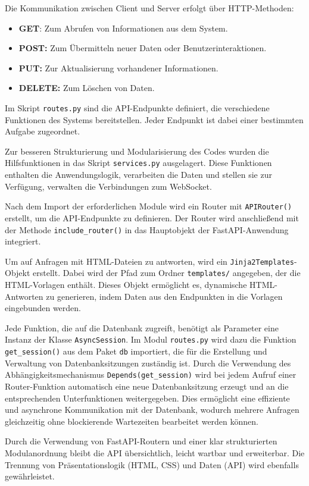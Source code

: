 \documentclass[12pt, letterpaper]{article}
\begin{document}
  
  \par Die Kommunikation zwischen Client und Server erfolgt über HTTP-Methoden:
  \begin{itemize}
    \item \textbf{GET}: Zum Abrufen von Informationen aus dem System.
    \item \textbf{POST:} Zum Übermitteln neuer Daten oder Benutzerinteraktionen.
    \item \textbf{PUT:} Zur Aktualisierung vorhandener Informationen. 
    \item \textbf{DELETE:} Zum Löschen von Daten.
  \end{itemize} 
  \par Im Skript \texttt{routes.py} sind die API-Endpunkte definiert, die verschiedene Funktionen des Systems bereitstellen. Jeder Endpunkt ist dabei einer bestimmten Aufgabe zugeordnet. 
  \par Zur besseren Strukturierung und Modularisierung des Codes wurden die Hilfsfunktionen in das Skript \texttt{services.py} ausgelagert. Diese Funktionen enthalten die Anwendungslogik, verarbeiten die Daten und stellen sie zur Verfügung, verwalten die Verbindungen zum WebSocket.
  \par Nach dem Import der erforderlichen Module wird ein Router mit \texttt{APIRouter()} erstellt, um die API-Endpunkte zu definieren. Der Router wird anschließend mit der Methode \texttt{include\_router()} in das Hauptobjekt der FastAPI-Anwendung integriert.
  \par Um auf Anfragen mit HTML-Dateien zu antworten, wird ein \texttt{Jinja2Templates}-Objekt erstellt. Dabei wird der Pfad zum Ordner \texttt{templates/} angegeben, der die HTML-Vorlagen enthält. Dieses Objekt ermöglicht es, dynamische HTML-Antworten zu generieren, indem Daten aus den Endpunkten in die Vorlagen eingebunden werden.
  \par Jede Funktion, die auf die Datenbank zugreift, benötigt als Parameter eine Instanz der Klasse \texttt{AsyncSession}. Im Modul \texttt{routes.py} wird dazu die Funktion \texttt{get\_session()} aus dem Paket \texttt{db} importiert, die für die Erstellung und Verwaltung von Datenbanksitzungen zuständig ist. Durch die Verwendung des Abhängigkeitsmechanismus \texttt{Depends(get\_session)} wird bei jedem Aufruf einer Router-Funktion automatisch eine neue Datenbanksitzung erzeugt und an die entsprechenden Unterfunktionen weitergegeben. Dies ermöglicht eine effiziente und asynchrone Kommunikation mit der Datenbank, wodurch mehrere Anfragen gleichzeitig ohne blockierende Wartezeiten bearbeitet werden können.
  \par Durch die Verwendung von FastAPI-Routern und einer klar strukturierten Modulanordnung bleibt die API übersichtlich, leicht wartbar und erweiterbar. Die Trennung von Präsentationslogik (HTML, CSS) und Daten (API) wird ebenfalls gewährleistet.
\end{document}
